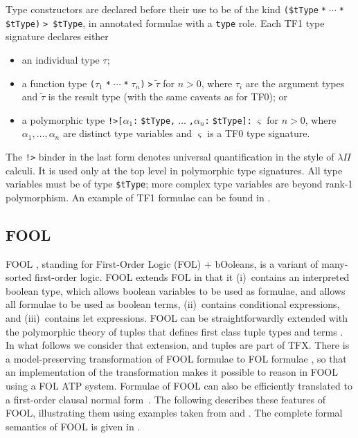 Type constructors are declared before their use to be of the kind
{\tt (\$tType$\;$*$\;{\cdots}\;$*$\;$\$tType)$\;$> \$tType}, in annotated 
formulae with a {\tt type} role.
Each TF1 type signature declares either
\begin{itemize}
\item an individual type $\tau$;
\item a function type {\tt ($\tau_1\;$*$\;{\cdots}\;$*$\;\tau_n$)$\;$>$\;\tilde \tau$}
      for $n > 0$, where $\tau_i$ are the argument types and $\tilde \tau$
      is the result type (with the same caveats as for TF0); or
\item a polymorphic type {\tt !>[$\alpha_1$:$\;$\$tType,$\;{\dots}\;$,$\alpha_n$:$\;$\$tType]:$\;\varsigma$}
      for $n > 0$, where $\alpha_1,\dots,\alpha_n$ are distinct
      type variables and $\varsigma$ is a TF0 type signature.
\end{itemize}

The {\tt !>} binder in the last form denotes universal quantification in the
style of $\lambda\Pi$ calculi.
It is used only at the top level in polymorphic type signatures.
All type variables must be of type {\tt \$tType}; more complex type variables
are beyond rank-1 polymorphism.
An example of TF1 formulae can be found in \cite{KSR16}.

\subsection{FOOL}
\label{sec:tfx/FOOL}

FOOL \cite{FOOL}, standing for First-Order Logic (FOL) + bOoleans, is a 
variant of many-sorted first-order logic. 
FOOL extends FOL in that it (i)~contains an interpreted boolean type, which
allows boolean variables to be used as formulae, and allows all formulae to be 
used as boolean terms, (ii)~contains conditional expressions, and 
(iii)~contains let expressions.
FOOL can be straightforwardly extended with the polymorphic theory of tuples 
that defines first class tuple types and terms \cite{KKV18}.
In what follows we consider that extension, and tuples are part of TFX.
There is a model-preserving transformation of FOOL formulae to FOL formulae
\cite{FOOL}, so that an implementation of the transformation makes it 
possible to reason in FOOL using a FOL ATP system.
Formulae of FOOL can also be efficiently translated to a first-order clausal 
normal form~\cite{FOOLCNF}. 
The following describes these features of FOOL, illustrating them using 
examples taken from \cite{VampireAndFOOL} and \cite{KKV18}.
The complete formal semantics of FOOL is given in \cite{FOOL}.

